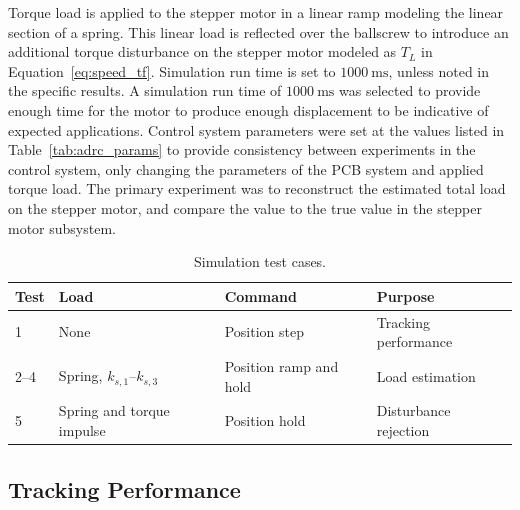 Torque load is applied to the stepper motor in a linear ramp modeling the linear section of a spring. This linear load is reflected over the ballscrew to introduce an additional torque disturbance on the stepper motor modeled as $T_L$ in Equation~\eqref{eq:speed_tf}. Simulation run time is set to $\SI{1000}{\milli\second}$, unless noted in the specific results. A simulation run time of $\SI{1000}{\milli\second}$ was selected to provide enough time for the motor to produce enough displacement to be indicative of expected applications. Control system parameters were set at the values listed in Table~\ref{tab:adrc_params} to provide consistency between experiments in the control system, only changing the parameters of the PCB system and applied torque load. The primary experiment was to reconstruct the estimated total load on the stepper motor, and compare the value to the true value in the stepper motor subsystem.

\begin{table}[htbp]
	\centering
	\caption{Simulation test cases.}
	\vspace{4pt}
	\label{tab:exp_cases}
	\begin{tabular}{llll}
		\hline
		Test & Load & Command & Purpose \\
		\hline
		1    & None                     & Position step & Tracking performance \\
		2--4 & Spring, $k_{s,1}$--$k_{s,3}$ & Position ramp and hold & Load estimation \\
		5    & Spring and torque impulse & Position hold & Disturbance rejection \\
		\hline
	\end{tabular}
\end{table}

\subsection{Tracking Performance}\label{sec:expPerformance}

